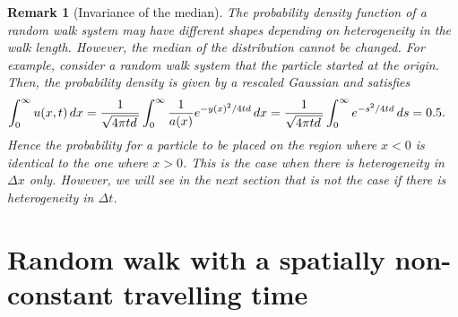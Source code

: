 \documentclass[11pt]{amsart}
\def\d{d}
\newtheorem{remark}{Remark}[section]
\begin{document}
\begin{remark}[Invariance of the median]\label{Answer1}
The probability density function of a random walk system may have different shapes depending on heterogeneity in the walk length. However, the median of the distribution cannot be changed. For example, consider a random walk system that the particle started at the origin. Then, the probability density is given by a rescaled Gaussian and satisfies
\begin{equation}\label{100}
\begin{split}
\int_0^\infty u(x,t)\,dx&=\frac{1}{\sqrt{4\pi t\d\,}}\int_0^\infty {1\over a(x)}e^{-y(x)^2/4t\d}\,dx
=\frac{1}{\sqrt{4\pi t\d\,}}\int_0^\infty e^{-s^2/4t\d}\,ds=0.5.
\end{split}
\end{equation}
Hence the probability for a particle to be placed on the region where $x<0$ is identical to the one where $x>0$. This is the case when there is heterogeneity in $\Delta x$ only. However, we will see in the next section that is not the case if there is heterogeneity in $\Delta t$.
\end{remark}



\newpage
\section{Random walk with a spatially non-constant travelling time}
\end{document}

